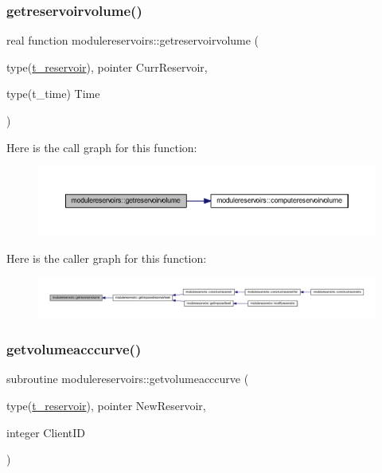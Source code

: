 \subsubsection{\texorpdfstring{getreservoirvolume()}{getreservoirvolume()}}
{\footnotesize\ttfamily real function modulereservoirs\+::getreservoirvolume (\begin{DoxyParamCaption}\item[{type(\mbox{\hyperlink{structmodulereservoirs_1_1t__reservoir}{t\+\_\+reservoir}}), pointer}]{Curr\+Reservoir,  }\item[{type(t\+\_\+time)}]{Time }\end{DoxyParamCaption})\hspace{0.3cm}{\ttfamily [private]}}

Here is the call graph for this function\+:\nopagebreak
\begin{figure}[H]
\begin{center}
\leavevmode
\includegraphics[width=350pt]{namespacemodulereservoirs_afabb38607932bfaede946ccbce22734d_cgraph}
\end{center}
\end{figure}
Here is the caller graph for this function\+:\nopagebreak
\begin{figure}[H]
\begin{center}
\leavevmode
\includegraphics[width=350pt]{namespacemodulereservoirs_afabb38607932bfaede946ccbce22734d_icgraph}
\end{center}
\end{figure}
\mbox{\label{namespacemodulereservoirs_af78ebbee661caa48931d2c60385bda27}} 
\subsubsection{\texorpdfstring{getvolumeacccurve()}{getvolumeacccurve()}}
{\footnotesize\ttfamily subroutine modulereservoirs\+::getvolumeacccurve (\begin{DoxyParamCaption}\item[{type(\mbox{\hyperlink{structmodulereservoirs_1_1t__reservoir}{t\+\_\+reservoir}}), pointer}]{New\+Reservoir,  }\item[{integer}]{Client\+ID }\end{DoxyParamCaption})\hspace{0.3cm}{\ttfamily [private]}}

